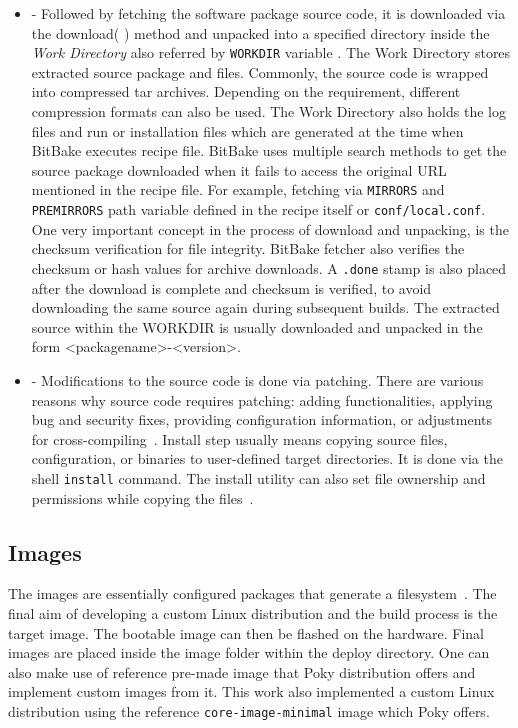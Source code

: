 \begin{itemize}
\item {} - Followed by fetching the software package source code, it is downloaded via the download( ) method and unpacked into a specified directory inside the \emph{Work Directory} also referred by \texttt{WORKDIR} variable . The Work Directory stores extracted source package and files. Commonly, the source code is wrapped into compressed tar archives. Depending on the requirement, different compression formats can also be used.  The Work Directory also holds the log files and run or installation files which are generated at the time when BitBake executes recipe file.  BitBake uses multiple search methods to get the source package downloaded when it fails to access the original \ac{URL} mentioned in the recipe file. For example, fetching via \texttt{MIRRORS} and \texttt{PREMIRRORS} path variable defined in the recipe itself or \texttt{conf/local.conf}. One very important concept in the process of download and unpacking, is the checksum verification for file integrity. BitBake fetcher also verifies the checksum or hash values for archive downloads.  A \texttt{.done} stamp is also placed after the download is complete and checksum is verified, to avoid downloading the same source again during subsequent builds. The extracted source within the WORKDIR is usually downloaded and unpacked in the form <packagename>-<version>.

\item {} - Modifications to the source code is done via patching. There are various reasons why source code requires patching: adding functionalities, applying bug and security fixes, providing configuration information, or adjustments for cross-compiling~\parencite{Reference1}. Install step usually means copying source files, configuration, or binaries to user-defined target directories. It is done via the shell \texttt{install} command. The install utility can also set file ownership and permissions while copying the files~\parencite{Reference1}.
\end{itemize}


\subsection{Images} 

The images  are  essentially configured  packages that generate a filesystem~\parencite{veromannembedded}. The final aim of developing a custom Linux distribution and the build process is the target image. The bootable image can then be flashed on the hardware. Final images are placed inside the image folder within the deploy  directory.  One can also make use of reference pre-made image that Poky distribution offers and implement custom images from it.  This work also implemented a custom Linux distribution using the reference \texttt{core-image-minimal} image which Poky offers.

